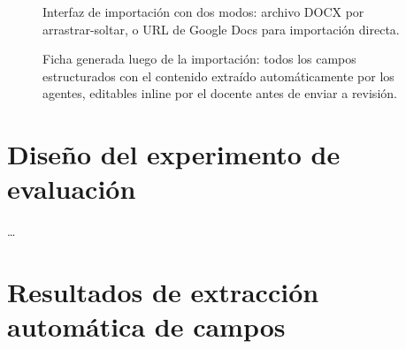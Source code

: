 \begin{figure}[H]
  \centering
  \caption[Pantalla de importación de propuesta por el Docente.]{Interfaz
    de importación con dos modos: archivo DOCX por arrastrar-soltar,
    o URL de Google Docs para importación directa.}
  \label{fig:cap_doc_importar}
\end{figure}

\begin{figure}[H]
  \centering
  \caption[Ficha de propuesta con campos extraídos.]{Ficha generada luego
    de la importación: todos los campos estructurados con el contenido
    extraído automáticamente por los agentes, editables inline por el
    docente antes de enviar a revisión.}
  \label{fig:cap_doc_ficha}
\end{figure}

\section{Diseño del experimento de evaluación}
\label{sec:disenio_experimento}

\ldots

\section{Resultados de extracción automática de campos}
\label{sec:resultados_extraccion}

